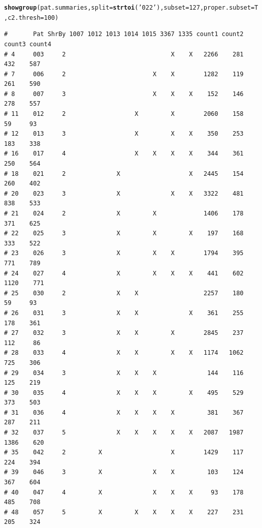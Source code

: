 \documentclass{article}\usepackage[]{graphicx}\usepackage[]{color}
\makeatletter
\newcommand{\hlnum}[1]{\textcolor[rgb]{0.686,0.059,0.569}{#1}}%
\newcommand{\hlstr}[1]{\textcolor[rgb]{0.192,0.494,0.8}{#1}}%
\newcommand{\hlstd}[1]{\textcolor[rgb]{0.345,0.345,0.345}{#1}}%
\newcommand{\hlkwc}[1]{\textcolor[rgb]{0.333,0.667,0.333}{#1}}%
\newcommand{\hlkwd}[1]{\textcolor[rgb]{0.737,0.353,0.396}{\textbf{#1}}}%
\newenvironment{kframe}{%
 \def\at@end@of@kframe{}%
 \ifinner\ifhmode%
  \def\at@end@of@kframe{\end{minipage}}%
  \begin{minipage}{\columnwidth}%
 \fi\fi%
 \def\FrameCommand##1{\hskip\@totalleftmargin \hskip-\fboxsep
 \colorbox{shadecolor}{##1}\hskip-\fboxsep
     \hskip-\linewidth \hskip-\@totalleftmargin \hskip\columnwidth}%
 \MakeFramed {\advance\hsize-\width
   \@totalleftmargin\z@ \linewidth\hsize
   \@setminipage}}%
 {\par\unskip\endMakeFramed%
 \at@end@of@kframe}
\newenvironment{knitrout}{}{} %
\makeatother
\begin{document}
\begin{knitrout}\footnotesize
{}\color{fgcolor}\begin{kframe}
\begin{alltt}
\hlkwd{showgroup}\hlstd{(pat.summaries,}\hlkwc{split}\hlstd{=}\hlkwd{strtoi}\hlstd{(}\hlstr{'022'}\hlstd{),} \hlkwc{subset}\hlstd{=}\hlnum{127}\hlstd{,} \hlkwc{proper.subset}\hlstd{=T,} \hlkwc{c2.thresh}\hlstd{=}\hlnum{100}\hlstd{)}
\end{alltt}
\begin{verbatim}
#       Pat ShrBy 1007 1012 1013 1014 1015 3367 1335 count1 count2 count3 count4
# 4     003     2                             X    X   2266    281    432    587
# 7     006     2                        X    X        1282    119    261    590
# 8     007     3                        X    X    X    152    146    278    557
# 11    012     2                   X         X        2060    158     59     93
# 12    013     3                   X         X    X    350    253    183    338
# 16    017     4                   X    X    X    X    344    361    250    564
# 18    021     2              X                   X   2445    154    260    402
# 20    023     3              X              X    X   3322    481    838    533
# 21    024     2              X         X             1406    178    371    625
# 22    025     3              X         X         X    197    168    333    522
# 23    026     3              X         X    X        1794    395    771    789
# 24    027     4              X         X    X    X    441    602   1120    771
# 25    030     2              X    X                  2257    180     59     93
# 26    031     3              X    X              X    361    255    178    361
# 27    032     3              X    X         X        2845    237    112     86
# 28    033     4              X    X         X    X   1174   1062    725    306
# 29    034     3              X    X    X              144    116    125    219
# 30    035     4              X    X    X         X    495    529    373    503
# 31    036     4              X    X    X    X         381    367    287    211
# 32    037     5              X    X    X    X    X   2087   1987   1386    620
# 35    042     2         X                   X        1429    117    224    394
# 39    046     3         X              X    X         103    124    367    604
# 40    047     4         X              X    X    X     93    178    485    708
# 48    057     5         X         X    X    X    X    227    231    205    324

\end{verbatim}
\end{kframe}
\end{knitrout}
\end{document}
